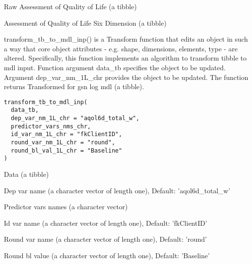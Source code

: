 \documentclass[a4paper]{book}
\begin{document}
%
\begin{Arguments}
\begin{ldescription}
\item[\code{raw\_aqol\_tb}] Raw Assessment of Quality of Life (a tibble)
\end{ldescription}
\end{Arguments}
%
\begin{Value}
Assessment of Quality of Life Six Dimension (a tibble)
\end{Value}
%
\begin{Description}\relax
transform\_tb\_to\_mdl\_inp() is a Transform function that edits an object in such a way that core object attributes - e.g. shape, dimensions, elements, type - are altered. Specifically, this function implements an algorithm to transform tibble to mdl input. Function argument data\_tb specifies the object to be updated. Argument dep\_var\_nm\_1L\_chr provides the object to be updated. The function returns Transformed for gsn log mdl (a tibble).
\end{Description}
%
\begin{Usage}
\begin{verbatim}
transform_tb_to_mdl_inp(
  data_tb,
  dep_var_nm_1L_chr = "aqol6d_total_w",
  predictor_vars_nms_chr,
  id_var_nm_1L_chr = "fkClientID",
  round_var_nm_1L_chr = "round",
  round_bl_val_1L_chr = "Baseline"
)
\end{verbatim}
\end{Usage}
%
\begin{Arguments}
\begin{ldescription}
\item[\code{data\_tb}] Data (a tibble)

\item[\code{dep\_var\_nm\_1L\_chr}] Dep var name (a character vector of length one), Default: 'aqol6d\_total\_w'

\item[\code{predictor\_vars\_nms\_chr}] Predictor vars names (a character vector)

\item[\code{id\_var\_nm\_1L\_chr}] Id var name (a character vector of length one), Default: 'fkClientID'

\item[\code{round\_var\_nm\_1L\_chr}] Round var name (a character vector of length one), Default: 'round'

\item[\code{round\_bl\_val\_1L\_chr}] Round bl value (a character vector of length one), Default: 'Baseline'
\end{ldescription}
\end{Arguments}
\end{document}
